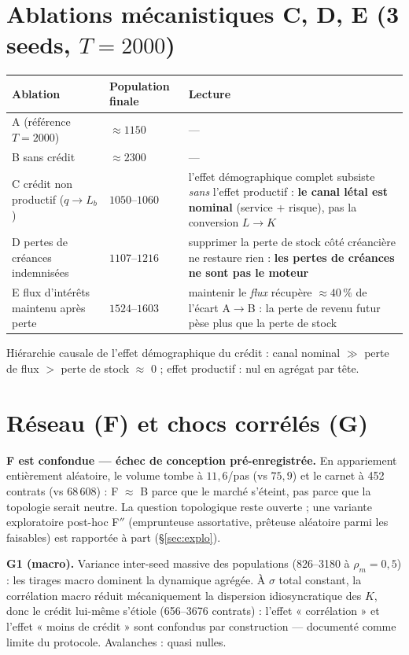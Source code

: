 \documentclass[11pt,a4paper]{article}
\begin{document}
\section{Ablations mécanistiques C, D, E (3 seeds, $T = 2000$)}

\begin{center}
\small
\begin{tabular}{llp{7.6cm}}
\toprule
Ablation & Population finale & Lecture \\
\midrule
A (référence $T{=}2000$) & $\approx 1150$ & --- \\
B sans crédit & $\approx 2300$ & --- \\
C crédit non productif ($q \to L_b$) & $1050$--$1060$ &
l'effet démographique complet subsiste \emph{sans} l'effet productif :
\textbf{le canal létal est nominal} (service + risque), pas la conversion
$L \to K$ \\
D pertes de créances indemnisées & $1107$--$1216$ &
supprimer la perte de stock côté créancière ne restaure rien :
\textbf{les pertes de créances ne sont pas le moteur} \\
E flux d'intérêts maintenu après perte & $1524$--$1603$ &
maintenir le \emph{flux} récupère $\approx 40\,\%$ de l'écart A$\to$B :
la perte de revenu futur pèse plus que la perte de stock \\
\bottomrule
\end{tabular}
\end{center}

Hiérarchie causale de l'effet démographique du crédit :
canal nominal $\gg$ perte de flux $>$ perte de stock $\approx$ 0 ;
effet productif : nul en agrégat par tête.

\section{Réseau (F) et chocs corrélés (G)}

\textbf{F est confondue — échec de conception pré-enregistrée.} En
appariement entièrement aléatoire, le volume tombe à $11{,}6$/pas (vs
$75{,}9$) et le carnet à 452 contrats (vs $68\,608$) : F $\approx$ B parce
que le marché s'éteint, pas parce que la topologie serait neutre. La
question topologique reste ouverte ; une variante exploratoire post-hoc
F$''$ (emprunteuse assortative, prêteuse aléatoire parmi les faisables) est
rapportée à part (§\ref{sec:explo}).

\textbf{G1 (macro).} Variance inter-seed massive des populations (826--3180
à $\rho_m = 0{,}5$) : les tirages macro dominent la dynamique agrégée. À
$\sigma$ total constant, la corrélation macro réduit mécaniquement la
dispersion idiosyncratique des $K$, donc le crédit lui-même s'étiole
(656--3676 contrats) : l'effet « corrélation » et l'effet « moins de
crédit » sont confondus par construction — documenté comme limite du
protocole. Avalanches : quasi nulles.
\end{document}
